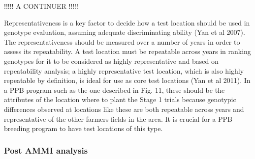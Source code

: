 \documentclass{article}\usepackage[]{graphicx}\usepackage[]{color}
\makeatletter
\newcommand{\hlopt}[1]{\textcolor[rgb]{0,0,0}{#1}}%
\newcommand{\hlstd}[1]{\textcolor[rgb]{0.345,0.345,0.345}{#1}}%
\newenvironment{kframe}{%
 \def\at@end@of@kframe{}%
 \ifinner\ifhmode%
  \def\at@end@of@kframe{\end{minipage}}%
  \begin{minipage}{\columnwidth}%
 \fi\fi%
 \def\FrameCommand##1{\hskip\@totalleftmargin \hskip-\fboxsep
 \colorbox{shadecolor}{##1}\hskip-\fboxsep
     \hskip-\linewidth \hskip-\@totalleftmargin \hskip\columnwidth}%
 \MakeFramed {\advance\hsize-\width
   \@totalleftmargin\z@ \linewidth\hsize
   \@setminipage}}%
 {\par\unskip\endMakeFramed%
 \at@end@of@kframe}
\newenvironment{knitrout}{}{} %
\makeatother
\begin{document}
\begin{itemize}

\end{itemize}

!!!!! A CONTINUER !!!!!

Representativeness is a key factor to decide how a test location should be used in
genotype evaluation, assuming adequate discriminating ability (Yan et al 2007). The
representativeness should be measured over a number of years in order to assess its
repeatability. A test location must be repeatable across years in ranking genotypes
for it to be considered as highly representative and based on repeatability analysis; a
highly representative test location, which is also highly repeatable by definition, is
ideal for use as core test locations (Yan et al 2011). In a PPB program such as the
one described in Fig. 11, these should be the attributes of the location where to
plant the Stage 1 trials because genotypic differences observed at locations like
these are both repeatable across years and representative of the other farmers fields
in the area. It is crucial for a PPB breeding program to have test locations of this
type.


\subsubsection{Post AMMI analysis}
\end{document}
